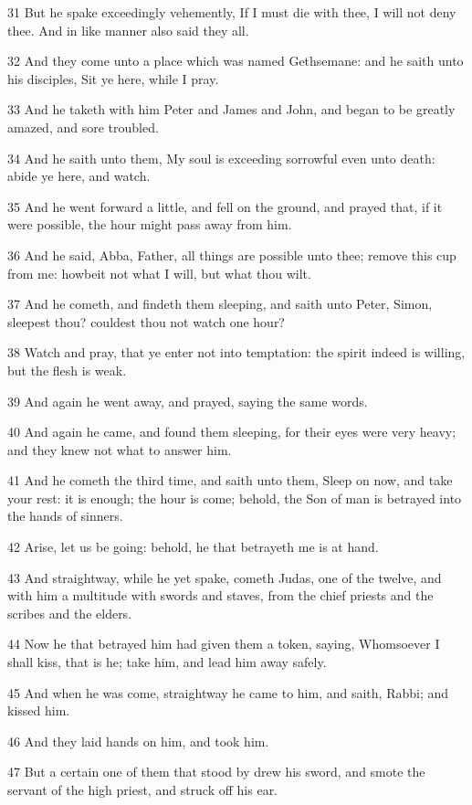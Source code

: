 \par 31 But he spake exceedingly vehemently, If I must die with thee, I will not deny thee. And in like manner also said they all.
\par 32 And they come unto a place which was named Gethsemane: and he saith unto his disciples, Sit ye here, while I pray.
\par 33 And he taketh with him Peter and James and John, and began to be greatly amazed, and sore troubled.
\par 34 And he saith unto them, My soul is exceeding sorrowful even unto death: abide ye here, and watch.
\par 35 And he went forward a little, and fell on the ground, and prayed that, if it were possible, the hour might pass away from him.
\par 36 And he said, Abba, Father, all things are possible unto thee; remove this cup from me: howbeit not what I will, but what thou wilt.
\par 37 And he cometh, and findeth them sleeping, and saith unto Peter, Simon, sleepest thou? couldest thou not watch one hour?
\par 38 Watch and pray, that ye enter not into temptation: the spirit indeed is willing, but the flesh is weak.
\par 39 And again he went away, and prayed, saying the same words.
\par 40 And again he came, and found them sleeping, for their eyes were very heavy; and they knew not what to answer him.
\par 41 And he cometh the third time, and saith unto them, Sleep on now, and take your rest: it is enough; the hour is come; behold, the Son of man is betrayed into the hands of sinners.
\par 42 Arise, let us be going: behold, he that betrayeth me is at hand.
\par 43 And straightway, while he yet spake, cometh Judas, one of the twelve, and with him a multitude with swords and staves, from the chief priests and the scribes and the elders.
\par 44 Now he that betrayed him had given them a token, saying, Whomsoever I shall kiss, that is he; take him, and lead him away safely.
\par 45 And when he was come, straightway he came to him, and saith, Rabbi; and kissed him.
\par 46 And they laid hands on him, and took him.
\par 47 But a certain one of them that stood by drew his sword, and smote the servant of the high priest, and struck off his ear.
